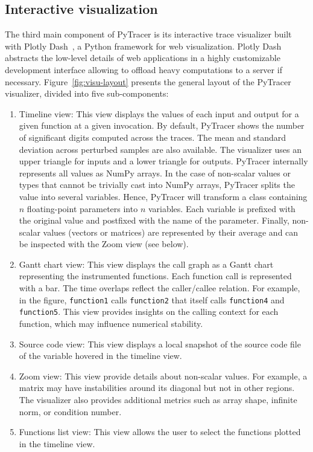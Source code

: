 \documentclass[10pt,journal,compsoc]{IEEEtran}
\newcommand{\pytracer}[0]{PyTracer\xspace}
\begin{document}
\subsection{Interactive visualization}
The third main component of \pytracer is its interactive trace visualizer built
with Plotly Dash~\cite{plotly}, a Python framework for web visualization. Plotly
Dash abstracts the low-level details of web applications in a highly
customizable development interface allowing to offload heavy computations to a
server if necessary. Figure~\ref{fig:visu-layout} presents the general layout of
the \pytracer visualizer, divided into five sub-components:
\begin{enumerate}
    \item Timeline view: This view displays the values of each input and output
          for a given function at a given invocation. By default, \pytracer
          shows the number of significant digits computed across the traces. The
          mean and standard deviation across perturbed samples are also
          available. The visualizer uses an upper triangle for inputs and a
          lower triangle for outputs. \pytracer internally represents all values
          as NumPy arrays. In the case of non-scalar values or types that cannot
          be trivially cast into NumPy arrays, \pytracer splits the value into
          several variables. Hence, \pytracer will transform a class containing
          $n$ floating-point parameters into $n$ variables. Each variable is
          prefixed with the original value and postfixed with the name of the
          parameter. Finally, non-scalar values (vectors or matrices) are
          represented by their average and can be inspected with the Zoom view
          (see below).
    \item Gantt chart view: This view displays the call graph as a Gantt chart
          representing the instrumented functions. Each function call is
          represented with a bar. The time overlaps reflect the caller/callee
          relation. For example, in the figure, \texttt{function1} calls
          \texttt{function2} that itself calls \texttt{function4} and
          \texttt{function5}. This view provides insights on the calling context
          for each function, which may influence numerical stability.
    \item  Source code view: This view displays a local snapshot of the source
          code file of the variable hovered in the timeline view.
    \item Zoom view: This view provide details about non-scalar values. For
          example, a matrix may have instabilities around its diagonal but not
          in other regions. The visualizer also provides additional metrics such
          as array shape, infinite norm, or condition number.
    \item  Functions list view: This view allows the user to select the
          functions plotted in the timeline view.
\end{enumerate}
\end{document}
